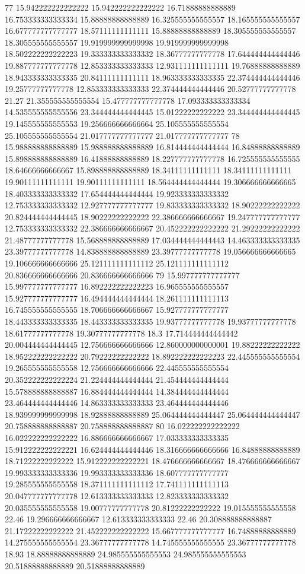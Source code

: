 77 15.942222222222222 15.942222222222222 16.71888888888889 16.753333333333334 15.88888888888889 16.325555555555557 18.165555555555557 16.677777777777777 18.57111111111111 15.88888888888889 18.305555555555557 18.305555555555557 19.919999999999998 19.919999999999998 18.502222222222223 19.333333333333332 18.36777777777778 17.644444444444446 19.887777777777778 12.853333333333333 12.931111111111111 19.76888888888889 18.943333333333335 20.84111111111111 18.963333333333335 22.374444444444446 19.25777777777778 12.853333333333333 22.374444444444446 20.52777777777778 21.27 21.355555555555554 15.477777777777778 17.093333333333334 14.535555555555556 23.344444444444445 15.01222222222222 23.344444444444445 19.145555555555553 19.256666666666664 25.105555555555554 25.105555555555554 21.017777777777777 21.017777777777777
78 15.988888888888889 15.988888888888889 16.814444444444444 16.84888888888889 15.898888888888889 16.41888888888889 18.227777777777778 16.725555555555555 18.64666666666667 15.898888888888889 18.34111111111111 18.34111111111111 19.90111111111111 19.90111111111111 18.564444444444444 19.306666666666665 18.403333333333332 17.654444444444444 19.923333333333332 12.753333333333332 12.927777777777777 19.833333333333332 18.90222222222222 20.824444444444445 18.90222222222222 22.386666666666667 19.247777777777777 12.753333333333332 22.386666666666667 20.452222222222222 21.29222222222222 21.48777777777778 15.568888888888889 17.034444444444443 14.463333333333335 23.39777777777778 14.838888888888889 23.39777777777778 19.056666666666665 19.106666666666666 25.121111111111112 25.121111111111112 20.836666666666666 20.836666666666666
79 15.997777777777777 15.997777777777777 16.892222222222223 16.965555555555557 15.927777777777777 16.494444444444444 18.261111111111113 16.745555555555555 18.706666666666667 15.927777777777777 18.443333333333335 18.443333333333335 19.93777777777778 19.93777777777778 18.61777777777778 19.30777777777778 18.3 17.714444444444442 20.004444444444445 12.756666666666666 12.860000000000001 19.88222222222222 18.952222222222222 20.79222222222222 18.892222222222223 22.445555555555554 19.265555555555558 12.756666666666666 22.445555555555554 20.352222222222224 21.224444444444444 21.454444444444444 15.578888888888887 16.884444444444444 14.384444444444444 23.464444444444446 14.863333333333333 23.464444444444446 18.939999999999998 18.92888888888889 25.064444444444447 25.064444444444447 20.758888888888887 20.758888888888887
80 16.022222222222222 16.022222222222222 16.886666666666667 17.033333333333335 15.912222222222221 16.624444444444446 18.316666666666666 16.84888888888889 18.71222222222222 15.912222222222221 18.476666666666667 18.476666666666667 19.993333333333336 19.993333333333336 18.607777777777777 19.285555555555558 18.371111111111112 17.741111111111113 20.047777777777778 12.613333333333333 12.823333333333332 20.035555555555558 19.00777777777778 20.81222222222222 19.015555555555558 22.46 19.296666666666667 12.613333333333333 22.46 20.308888888888887 21.17222222222222 21.452222222222222 15.667777777777777 16.74888888888889 14.275555555555554 23.36777777777778 14.745555555555555 23.36777777777778 18.93 18.88888888888889 24.985555555555553 24.985555555555553 20.51888888888889 20.51888888888889

